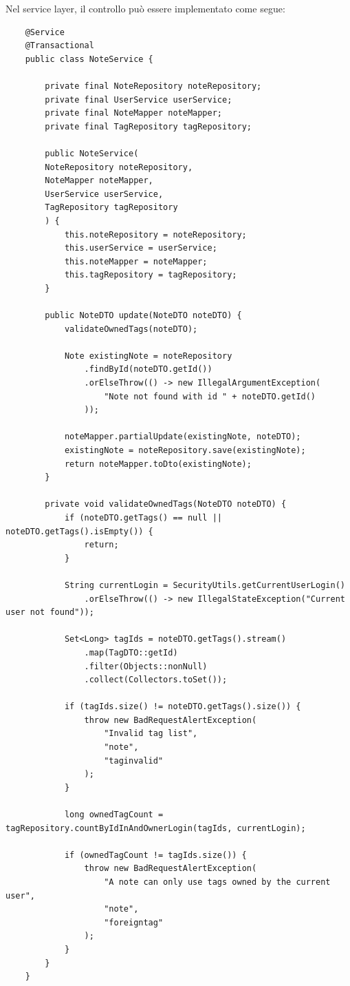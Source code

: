 Nel service layer, il controllo può essere implementato come segue:

\captionsetup{type=listing}
\label{lst:tdd-green-service}
\begin{verbatim}
	@Service
	@Transactional
	public class NoteService {
		
		private final NoteRepository noteRepository;
		private final UserService userService;
		private final NoteMapper noteMapper;
		private final TagRepository tagRepository;
		
		public NoteService(
		NoteRepository noteRepository,
		NoteMapper noteMapper,
		UserService userService,
		TagRepository tagRepository
		) {
			this.noteRepository = noteRepository;
			this.userService = userService;
			this.noteMapper = noteMapper;
			this.tagRepository = tagRepository;
		}
		
		public NoteDTO update(NoteDTO noteDTO) {
			validateOwnedTags(noteDTO);
			
			Note existingNote = noteRepository
				.findById(noteDTO.getId())
				.orElseThrow(() -> new IllegalArgumentException(
					"Note not found with id " + noteDTO.getId()
				));
			
			noteMapper.partialUpdate(existingNote, noteDTO);
			existingNote = noteRepository.save(existingNote);
			return noteMapper.toDto(existingNote);
		}
		
		private void validateOwnedTags(NoteDTO noteDTO) {
			if (noteDTO.getTags() == null || noteDTO.getTags().isEmpty()) {
				return;
			}
			
			String currentLogin = SecurityUtils.getCurrentUserLogin()
				.orElseThrow(() -> new IllegalStateException("Current user not found"));
			
			Set<Long> tagIds = noteDTO.getTags().stream()
				.map(TagDTO::getId)
				.filter(Objects::nonNull)
				.collect(Collectors.toSet());
			
			if (tagIds.size() != noteDTO.getTags().size()) {
				throw new BadRequestAlertException(
					"Invalid tag list",
					"note",
					"taginvalid"
				);
			}
			
			long ownedTagCount = tagRepository.countByIdInAndOwnerLogin(tagIds, currentLogin);
			
			if (ownedTagCount != tagIds.size()) {
				throw new BadRequestAlertException(
					"A note can only use tags owned by the current user",
					"note",
					"foreigntag"
				);
			}
		}
	}
\end{verbatim}

